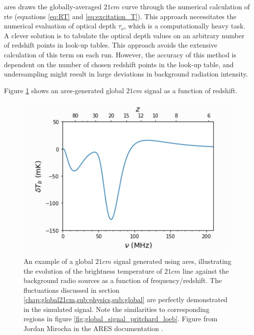 \documentclass[12pt, TexShade, letterpaper]{report}
\begin{document}
\gls{ares} draws the globally-averaged $21cm$ curve through the numerical calculation of \gls{rte} (equations \ref{eq:RT} and \ref{eq:excitation_T}). This approach necessitates the numerical evaluation of optical depth $\tau_\nu$, which is a computationally heavy task. A clever solution is to tabulate the optical depth values on an arbitrary number of redshift points in look-up tables. This approach avoids the extensive calculation of this term on each run. However, the accuracy of this method is dependent on the number of chosen redshift points in the look-up table, and undersampling might result in large deviations in background radiation intensity.\par
Figure \ref{fig:ares_Curve} shows an \gls{ares}-generated global $21cm$ signal as a function of redshift.\par
\begin{figure}[h!]
    \centering
    \includegraphics[scale =0.8]{ares_curve.jpg}
    \caption[Typical global $21cm$ curve generated using \gls{ares}]{An example of a global $21cm$ signal generated using \gls{ares}, illustrating the evolution of the brightness temperature of $21cm$ line against the background radio sources as a function of frequency/redshift. The fluctuations discussed in section \ref{chap:global21cm,sub:physics,sub:global} are perfectly demonstrated in the simulated signal. Note the similarities to corresponding regions in figure \ref{fig:global_signal_pritchard_loeb}. Figure from Jordan Mirocha in the ARES documentation \cite{ares_documentation}.}
    \label{fig:ares_Curve}
\end{figure}
\end{document}
